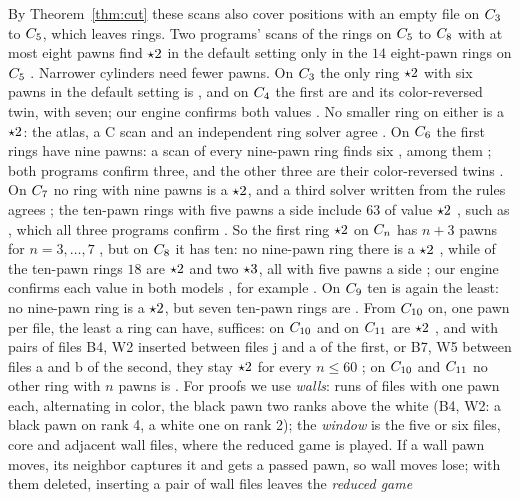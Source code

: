By Theorem~\ref{thm:cut} these scans also cover positions with an empty file on $C_{3}$ to $C_{5}$, which
leaves rings. Two programs' scans of the rings on
$C_{5}$ to $C_{8}$ with at most eight pawns find $\mathord{\star2}$ in the default setting only in the $14$
eight-pawn rings on $C_{5}$ . Narrower cylinders need fewer pawns. On $C_{3}$ the only ring
$\mathord{\star2}$ with six pawns in the default setting is , and on $C_{4}$ the first
are  and its color-reversed twin, with seven; our engine confirms both values
. No smaller ring on either is a $\mathord{\star2}$: the atlas, a C scan and an independent ring solver agree
. On $C_{6}$ the first rings have nine pawns: a scan of every
nine-pawn ring finds six , among them ; both programs confirm
three, and the other three are their color-reversed twins . On $C_{7}$ no ring with nine pawns is a
$\mathord{\star2}$, and a third solver written from the rules agrees ; the ten-pawn rings with five pawns a side
include $63$ of value $\mathord{\star2}$ , such as , which all three
programs confirm . So the first ring $\mathord{\star2}$ on $C_{n}$ has $n+3$ pawns for $n=3,\dots,7$
, but on $C_{8}$ it has ten: no nine-pawn ring there is a $\mathord{\star2}$ , while of the ten-pawn
rings $18$ are $\mathord{\star2}$ and two $\mathord{\star3}$, all with five pawns a side ; our engine
confirms each value in both models , for example . On $C_{9}$
ten is again the least: no nine-pawn ring is a $\mathord{\star2}$, but seven ten-pawn rings are . From $C_{10}$ on, one pawn per file, the least a
ring can have, suffices:  on $C_{10}$ and  on $C_{11}$ are $\mathord{\star2}$ , and with pairs of files B4, W2 inserted between files j and a
of the first, or B7, W5 between files a and b of the second, they stay $\mathord{\star2}$ for every $n\le60$ ; on $C_{10}$ and $C_{11}$ no other ring with $n$ pawns is .
For proofs we use \emph{walls}: runs of files with one pawn each, alternating in color, the black pawn two
ranks above the white (B4, W2: a black pawn on rank 4, a white one on rank 2); the \emph{window} is the
five or six files, core and adjacent wall files, where the reduced game is played. If a wall pawn moves, its neighbor captures it and gets a passed
pawn, so wall moves lose; with them deleted, inserting a pair of wall files leaves the \emph{reduced game}
